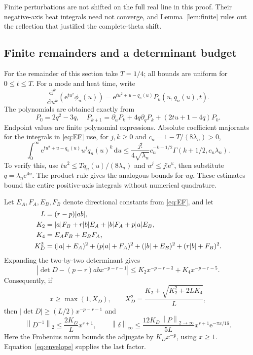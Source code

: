 \documentclass[11pt]{article}
\theoremstyle{remark}\newtheorem{remark}[theorem]{Remark}
\newcommand{\norm}[1]{\left\lVert #1\right\rVert}
\newcommand{\dd}{\,\mathrm d}
\newcommand{\e}{\mathrm e}
\begin{document}
Finite perturbations are not shifted on the full real line in this proof. Their negative-axis heat integrals need not converge, and Lemma~\ref{lem:finite} rules out the reflection that justified the complete-theta shift.

\subsection{Finite remainders and a determinant budget}
For the remainder of this section take $T=1/4$; all bounds are uniform for $0\le t\le T$.
For a mode and heat time, write
\[
 \frac{\mathrm d^k}{\mathrm du^k}(\e^{tu^2}\phi_n(u))
 =\e^{tu^2+u-q_n(u)}P_k(u,q_n(u),t).
\]
The polynomials are obtained exactly from
\begin{equation}\label{eq:recurrence}
 P_0=2q^2-3q,\quad
 P_{k+1}=\partial_uP_k+4q\partial_qP_k+(2tu+1-4q)P_k.
\end{equation}
Endpoint values are finite polynomial expressions. Absolute coefficient majorants for the integrals in \eqref{eq:EF} use, for $j,k\ge0$ and $c_n=1-T/(8\lambda_n)>0$,
\begin{equation}\label{eq:monomial}
 \int_0^\infty\e^{tu^2+u-q_n(u)}u^jq_n(u)^k\dd u
 \le\frac{j!}{4\sqrt{\lambda_n}}c_n^{-k-1/2}
       \Gamma(k+1/2,c_n\lambda_n).
\end{equation}
To verify this, use $tu^2\le Tq_n(u)/(8\lambda_n)$ and $u^j\le j!\e^u$, then substitute $q=\lambda_n\e^{4u}$. The product rule gives the analogous bounds for $ug$. These estimates bound the entire positive-axis integrals without numerical quadrature.

Let $E_A,F_A,E_B,F_B$ denote directional constants from \eqref{eq:EF}, and let
\begin{align}\label{eq:budget}
 L&=(r-p)|ab|,\notag\\
 K_2&=|a|F_B+r|b|E_A+|b|F_A+p|a|E_B,\notag\\
 K_4&=E_AF_B+E_BF_A,\notag\\
 K_D^2&=(|a|+E_A)^2+(p|a|+F_A)^2
       +( |b|+E_B)^2+(r|b|+F_B)^2.
\end{align}
Expanding the two-by-two determinant gives
\[
 |\det D-(p-r)abx^{-p-r-1}|
 \le K_2x^{-p-r-3}+K_4x^{-p-r-5}.
\]
Consequently, if
\begin{equation}\label{eq:XD}
 x\ge\max(1,X_D),\qquad
 X_D^2=\frac{K_2+\sqrt{K_2^2+2LK_4}}{L},
\end{equation}
then $|\det D|\ge(L/2)x^{-p-r-1}$ and
\begin{equation}\label{eq:inverseexplicit}
 \norm{D^{-1}}_2\le\frac{2K_D}{L}x^{r+1},\qquad
 \norm\delta_\infty\le\frac{12K_D\norm P_{2\to\infty}}{5L}
 x^{r+1}\e^{-\pi x/16}.
\end{equation}
Here the Frobenius norm bounds the adjugate by $K_Dx^{-p}$, using $x\ge1$. Equation~\eqref{eq:envelope} supplies the last factor.
\end{document}

